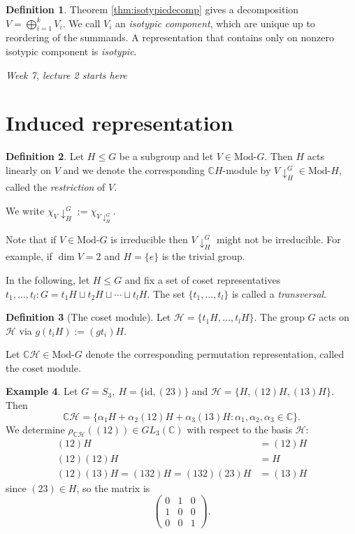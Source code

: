 \documentclass[a4paper]{article}
\newcommand{\cH}{\mathcal{H}}
\newcommand{\C}{\mathbb{C}}
\newcommand{\id}{\text{id}}
\newcommand{\Mod}{\text{Mod-}}
\theoremstyle{definition}
\newtheorem{defn}{Definition}[subsection]
\newtheorem{example}[defn]{Example}
\begin{document}
\begin{defn}
Theorem \ref{thm:isotypicdecomp} gives a decomposition $V=\bigoplus_{i=1}^k V_i$. We call $V_i$ an \textit{isotypic component}, which are unique up to reordering of the summands. A representation that contains only on nonzero isotypic component is \textit{isotypic}.
\end{defn}

\begin{flushright}
\textit{Week 7, lecture 2 starts here}
\end{flushright}

\section{Induced representation}
\begin{defn}
Let $H\leq G$ be a subgroup and let $V\in\Mod G$. Then $H$ acts linearly on $V$ and we denote the corresponding $\C H$-module by $V\downarrow_H^G\in\Mod H$, called the \textit{restriction} of $V$.

We write $\chi_V\downarrow_H^G:=\chi_{V\downarrow_H^G}$.
\end{defn}
Note that if $V\in\Mod G$ is irreducible then $V\downarrow_H^G$ might not be irreducible. For example, if $\dim V=2$ and $H=\{e\}$ is the trivial group.

In the following, let $H\leq G$ and fix a set of coset representatives $t_1,\ldots,t_l:G=t_1H\sqcup t_2H\sqcup\cdots\sqcup t_lH$. The set $\{t_1,\ldots,t_l\}$ is called a \textit{transversal}.

\begin{defn}[The coset module]
Let $\cH=\{t_1H,\ldots,t_l H\}$. The group $G$ acts on $\cH$ via $g(t_i H):=(gt_i)H$.

Let $\C\cH\in\Mod G$ denote the corresponding permutation representation, called the coset module.
\end{defn}

\begin{example}
Let $G=S_3,\ H=\{\id,(23)\}$ and $\cH=\{H,(12)H,(13)H\}$. Then
\[
\C\cH=\{\alpha_1 H+\alpha_2(12)H+\alpha_3(13)H:\alpha_1,\alpha_2,\alpha_3\in\C\}.
\]
We determine $\rho_{\C\cH}((12))\in GL_3(\C)$ with respect to the basis $\cH$:
\[
\begin{aligned}
(12)H&=(12)H\\
(12)(12)H&=H\\
(12)(13)H=(132)H=(132)(23)H&=(13)H
\end{aligned}
\]
since $(23)\in H$, so the matrix is
\[
\begin{pmatrix}
0&1&0\\1&0&0\\0&0&1
\end{pmatrix}.
\]
\end{example}
\end{document}
